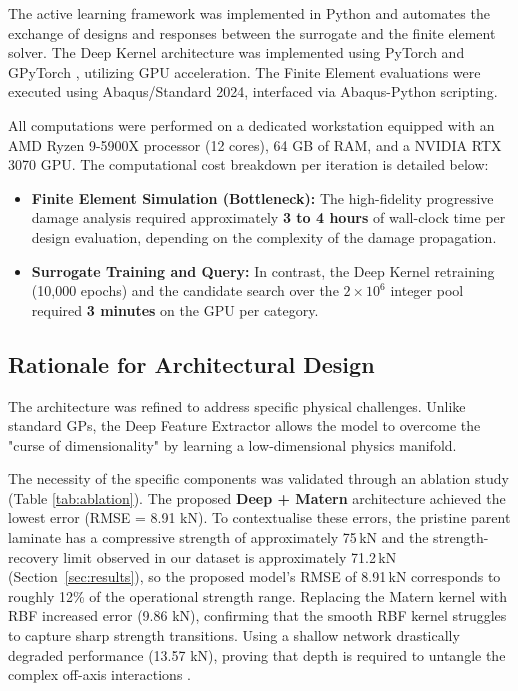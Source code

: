 \documentclass[
  preprint,
  12pt,
  a4paper
]{elsarticle}
\newcommand{\new}[1]{#1}
\begin{document}
The active learning framework was \new{implemented in Python and automates the exchange of designs and responses between the surrogate and the finite element solver.} The Deep Kernel architecture was implemented using PyTorch \cite{paszke2019pytorch} and GPyTorch \cite{gardner2018gpytorch}, utilizing GPU acceleration. The Finite Element evaluations were executed using Abaqus/Standard 2024, interfaced via Abaqus-Python scripting.

All computations were performed on a dedicated workstation equipped with an AMD Ryzen 9-5900X processor (12 cores), 64 GB of RAM, and a NVIDIA RTX 3070 GPU. The computational cost breakdown per iteration is detailed below:

\begin{itemize}
    \item \textbf{Finite Element Simulation (Bottleneck):} The high-fidelity progressive damage analysis required approximately \textbf{3 to 4 hours} of wall-clock time per design evaluation, depending on the complexity of the damage propagation.
    \item \textbf{Surrogate Training and Query:} In contrast, the Deep Kernel retraining (10,000 epochs) and the candidate search over the $2 \times 10^6$ integer pool required \textbf{3 minutes} on the GPU per category.
\end{itemize}


\subsection{Rationale for Architectural Design}
\label{sec:ai_rationale}

The architecture was refined to address specific physical challenges. Unlike standard GPs, the Deep Feature Extractor allows the model to overcome the "curse of dimensionality" by learning a low-dimensional physics manifold. 

The necessity of the specific components was validated through an ablation study (Table \ref{tab:ablation}). The proposed \textbf{Deep + Matern} architecture achieved the lowest error (RMSE = 8.91 kN). \new{To contextualise these errors, the pristine parent laminate has a compressive strength of approximately 75\,kN and the strength-recovery limit observed in our dataset is approximately 71.2\,kN (Section~\ref{sec:results}), so the proposed model's RMSE of 8.91\,kN corresponds to roughly 12\% of the operational strength range.} Replacing the Matern kernel with RBF increased error (9.86 kN), confirming that the smooth RBF kernel struggles to capture sharp strength transitions. Using a shallow network drastically degraded performance (13.57 kN), proving that depth is required to untangle the complex off-axis interactions \cite{montufar2014number}.
\end{document}
